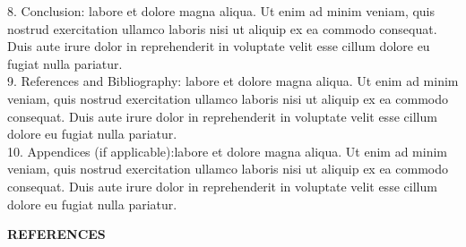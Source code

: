 \documentclass[12pt]{article}
\newcommand{\centersection}[1]{%
  \begin{center}
    \fontfamily{ptm}\fontsize{14}{16}\selectfont\bfseries\uppercase{#1}
  \end{center}
}
\begin{document}
8.	Conclusion: labore et dolore magna aliqua. Ut enim ad minim veniam, quis nostrud exercitation ullamco laboris nisi ut aliquip ex ea commodo consequat. Duis aute irure dolor in reprehenderit in voluptate velit esse cillum dolore eu fugiat nulla pariatur.\\
9.	References and Bibliography: labore et dolore magna aliqua. Ut enim ad minim veniam, quis nostrud exercitation ullamco laboris nisi ut aliquip ex ea commodo consequat. Duis aute irure dolor in reprehenderit in voluptate velit esse cillum dolore eu fugiat nulla pariatur.\\
10.	Appendices (if applicable):labore et dolore magna aliqua. Ut enim ad minim veniam, quis nostrud exercitation ullamco laboris nisi ut aliquip ex ea commodo consequat. Duis aute irure dolor in reprehenderit in voluptate velit esse cillum dolore eu fugiat nulla pariatur.

\newpage %

\centersection{REFERENCES}
\end{document}
